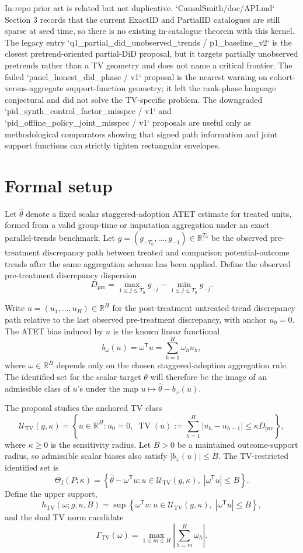 \documentclass[11pt]{article}
\newcommand{\transpose}{\mathsf{T}}
\newcommand{\R}{\mathbb{R}}
\theoremstyle{definition}
\theoremstyle{plain}
\theoremstyle{remark}
\begin{document}
In-repo prior art is related but not duplicative. `CausalSmith/doc/API.md` Section 3 records that the current ExactID and PartialID catalogues are still sparse at seed time, so there is no existing in-catalogue theorem with this kernel. The legacy entry `q1_partial_did_unobserved_trends / p1_baseline_v2` is the closest pretrend-oriented partial-DiD proposal, but it targets partially unobserved pretrends rather than a TV geometry and does not name a critical frontier. The failed `panel_honest_did_phase / v1` proposal is the nearest warning on cohort-versus-aggregate support-function geometry; it left the rank-phase language conjectural and did not solve the TV-specific problem. The downgraded `pid_synth_control_factor_misspec / v1` and `pid_offline_policy_joint_misspec / v1` proposals are useful only as methodological comparators showing that signed path information and joint support functions can strictly tighten rectangular envelopes.

\section{Formal setup}
Let \(\hat\theta\) denote a fixed scalar staggered-adoption ATET estimate for treated units, formed from a valid group-time or imputation aggregation under an exact parallel-trends benchmark. Let \(g=(g_{-T_0},\ldots,g_{-1})\in\R^{T_0}\) be the observed pre-treatment discrepancy path between treated and comparison potential-outcome trends after the same aggregation scheme has been applied. Define the observed pre-treatment discrepancy dispersion
\[
D_{\mathrm{pre}}=\max_{1\le j\le T_0} g_{-j}-\min_{1\le j\le T_0} g_{-j}.
\]

Write \(u=(u_1,\ldots,u_H)\in\R^H\) for the post-treatment untreated-trend discrepancy path relative to the last observed pre-treatment discrepancy, with anchor \(u_0=0\). The ATET bias induced by \(u\) is the known linear functional
\[
b_\omega(u)=\omega^\transpose u=\sum_{h=1}^H \omega_h u_h,
\]
where \(\omega\in\R^H\) depends only on the chosen staggered-adoption aggregation rule. The identified set for the scalar target \(\theta\) will therefore be the image of an admissible class of \(u\)'s under the map \(u\mapsto \hat\theta-b_\omega(u)\).

The proposal studies the anchored TV class
\[
\mathcal U_{\mathrm{TV}}(g,\kappa)
=
\left\{
u\in\R^H:
u_0=0,\;
\operatorname{TV}(u):=\sum_{h=1}^H |u_h-u_{h-1}|
\le \kappa D_{\mathrm{pre}}
\right\},
\]
where \(\kappa\ge 0\) is the sensitivity radius. Let \(B>0\) be a maintained outcome-support radius, so admissible scalar biases also satisfy \(|b_\omega(u)|\le B\). The TV-restricted identified set is
\[
\Theta_I(P;\kappa)
=
\left\{
\hat\theta-\omega^\transpose u:
u\in \mathcal U_{\mathrm{TV}}(g,\kappa),\;
| \omega^\transpose u|\le B
\right\}.
\]
Define the upper support,
\[
h_{\mathrm{TV}}(\omega;g,\kappa,B)
=
\sup\left\{
\omega^\transpose u:
u\in \mathcal U_{\mathrm{TV}}(g,\kappa),\;
|\omega^\transpose u|\le B
\right\},
\]
and the dual TV norm candidate
\[
\Gamma_{\mathrm{TV}}(\omega)
=
\max_{1\le m\le H}
\left|
\sum_{h=m}^H \omega_h
\right|.
\]
\end{document}
